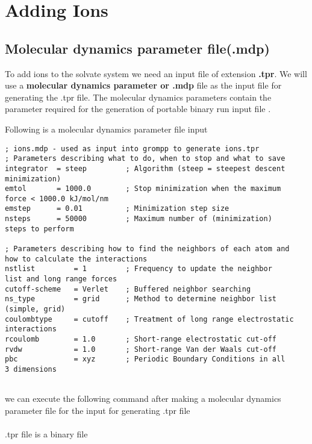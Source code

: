 \section{Adding Ions}
\subsection{Molecular dynamics parameter file(.mdp)}
To add ions to the solvate system we need an input file of extension \textbf{.tpr}. We will use a\textbf{ molecular dynamics parameter or .mdp} file as the input file for generating the .tpr file. The molecular dynamics parameters contain the parameter required for the generation of portable binary run input file . 

Following is a molecular dynamics parameter file input

\begin{verbatim}
; ions.mdp - used as input into grompp to generate ions.tpr
; Parameters describing what to do, when to stop and what to save
integrator  = steep         ; Algorithm (steep = steepest descent
minimization)
emtol       = 1000.0        ; Stop minimization when the maximum 
force < 1000.0 kJ/mol/nm
emstep      = 0.01          ; Minimization step size
nsteps      = 50000         ; Maximum number of (minimization)                   steps to perform

; Parameters describing how to find the neighbors of each atom and
how to calculate the interactions
nstlist         = 1         ; Frequency to update the neighbor 
list and long range forces
cutoff-scheme	= Verlet    ; Buffered neighbor searching 
ns_type         = grid      ; Method to determine neighbor list         
(simple, grid)
coulombtype     = cutoff    ; Treatment of long range electrostatic 
interactions
rcoulomb        = 1.0       ; Short-range electrostatic cut-off
rvdw            = 1.0       ; Short-range Van der Waals cut-off
pbc             = xyz       ; Periodic Boundary Conditions in all                 3 dimensions
   
\end{verbatim}

we can execute the following command after making a molecular dynamics parameter file for the input for generating .tpr file \\

\noindent{}\\

.tpr file is a binary file
